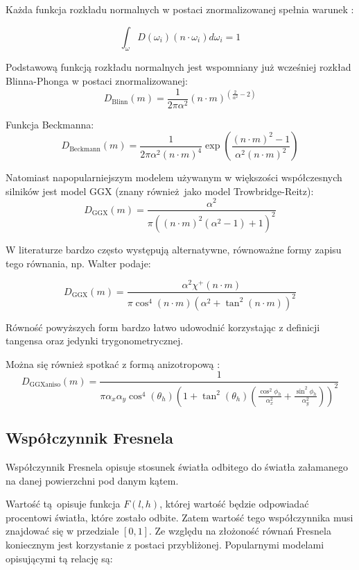 \documentclass[../main.tex]{subfiles}
\begin{document}
Każda funkcja rozkładu normalnych w postaci znormalizowanej spełnia warunek
\cite{NDFReed}:

\[
  \int_{\omega} {
    D(\omega_i)
    (n \cdot \omega_i)
    d \omega_i
  } = 1
\]

Podstawową funkcją rozkładu normalnych jest wspomniany już wcześniej rozkład
Blinna-Phonga w postaci znormalizowanej:
\[
  D_{\text{Blinn}}(m) =
    \frac{1}{2\pi\alpha^2}
    (n \cdot m)^{(\frac{2}{\alpha^2} - 2)}
\]

Funkcja Beckmanna:
\[
  D_{\text{Beckmann}}(m) =
    \frac{1}{2\pi\alpha^2 (n \cdot m)^{4}}
    \exp\left(
      \frac{
        (n \cdot m)^2 - 1
      }{
        \alpha^2 (n \cdot m)^2
      }
    \right)
\]

Natomiast napopularniejszym modelem używanym w większości współczesnych silników
jest model GGX (znany również jako model Trowbridge-Reitz):
\[
  D_{\text{GGX}}(m) =
    \frac{
      \alpha^2
    }{
      \pi \left(
        \left(n \cdot m \right)^{2}
        \left(\alpha^2 - 1 \right)
        + 1
      \right)^2
    }
\]

W literaturze bardzo często występują alternatywne, równoważne formy zapisu
tego równania, np. Walter podaje: %

\[
  D_{\text{GGX}}(m) =
    \frac{\alpha^2 \chi^{+}(n \cdot m)}{
      \pi \cos^{4} (n \cdot m) \left( \alpha^2 + \tan^2 (n \cdot m) \right)^2
    }
\]

\noindent Równość powyższych form bardzo łatwo udowodnić korzystając z
definicji tangensa oraz jedynki trygonometrycznej.

Można się również spotkać z formą anizotropową \cite{pbrt}:
\[
  D_{\text{GGXaniso}}(m) =
    \frac{1}{
      \pi \alpha_x \alpha_y \cos^{4} (\theta_h) \left(
        1 + \tan^{2}(\theta_h) \left(
          \frac{\cos^{2}{\phi_h}}{\alpha_{x}^{2}} +
          \frac{\sin^{2}{\phi_h}}{\alpha_{y}^{2}}
        \right)
      \right)^{2}
    }
\]

\subsection{Współczynnik Fresnela}

Współczynnik Fresnela opisuje stosunek światła odbitego do światła załamanego
na danej powierzchni pod danym kątem.

Wartość tą opisuje funkcja $F(l,h)$, której wartość będzie odpowiadać
procentowi światła, które zostało odbite. Zatem wartość tego współczynnika musi
znajdować się w przedziale $[0,1]$. Ze względu na złożoność równań Fresnela
koniecznym jest korzystanie z postaci przybliżonej. Popularnymi modelami
opisującymi tą relację są:
\end{document}
